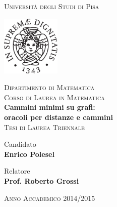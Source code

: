 \begin{titlepage}
\begin{center}
\large
\textsc{\Large Universit\`a degli Studi di Pisa}
\vspace{0.5cm}

\includegraphics[width=2.8cm]{unipi.pdf}

\vspace{0.5cm}
\textsc{\large Dipartimento di Matematica}\\
\vspace{0.2cm}
\textsc{\Large{Corso di Laurea in Matematica}}\\[3cm]

{\Huge\textbf{Cammini minimi su grafi:\\[0.3cm] oracoli per distanze e
  cammini}}\\[3.5cm]

\textsc{\LARGE Tesi di Laurea Triennale}\\[3cm]

\begin{minipage}{0.45\linewidth}
\begin{center}
{\Large Candidato\\} \vspace{0.1cm} \textbf{{\Large Enrico Polesel}}
\end{center}
\end{minipage}
\hfill
\begin{minipage}{0.45\linewidth}
\begin{center}
{\Large Relatore\\} \vspace{0.1cm} \textbf{{\Large Prof. Roberto Grossi}}
\end{center}
\end{minipage}

\vspace{2cm}
\begin{center}
\textsc{\Large Anno Accademico 2014/2015}
\end{center}
\end{center}
\end{titlepage}
\setcounter{page}{2}

